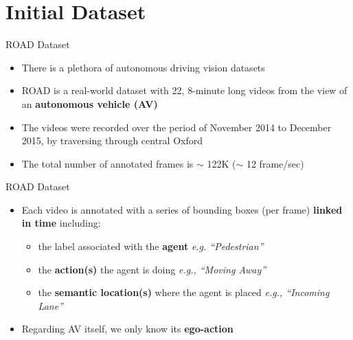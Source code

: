 \documentclass[10pt, aspectratio=169]{beamer}
\begin{document}
\section{Initial Dataset}
{
    \begin{frame}
        \sectionpage%
    \end{frame}
}

\begin{frame}{ROAD Dataset}
    \begin{itemize}
        \setlength{\itemsep}{13pt}
        \item There is a plethora of autonomous driving vision datasets
        \item ROAD is a real-world dataset with \textcolor{umBlueLighter}{22}, \textcolor{umBlueLighter}{8-minute} long videos from the view of an \textbf{autonomous vehicle (AV)}
        \item The videos were recorded over the period of November 2014 to December 2015, by traversing through central Oxford
        \item The total number of annotated frames is $\sim$ 122K ($\sim$ 12 frame/sec)
    \end{itemize}
\end{frame}


\begin{frame}{ROAD Dataset}
    \begin{itemize}
        \setlength{\itemsep}{13pt}
        \item Each video is annotated with a \textcolor{umBlueLighter}{series of bounding boxes} (per frame) \textbf{linked in time} including:
        \vspace{4pt}
        \begin{itemize}
            \setlength{\itemsep}{4pt}
            \item the label associated with the \textbf{agent} \textit{e.g. “Pedestrian”}
            \item the \textbf{action(s)} the agent is doing \textit{e.g., “Moving Away”} 
            \item the \textbf{semantic location(s)} where the agent is placed \textit{e.g., “Incoming Lane”}
        \end{itemize}
        \item Regarding AV itself, we only know its \textbf{ego-action}
    \end{itemize}
\end{frame}
\end{document}

